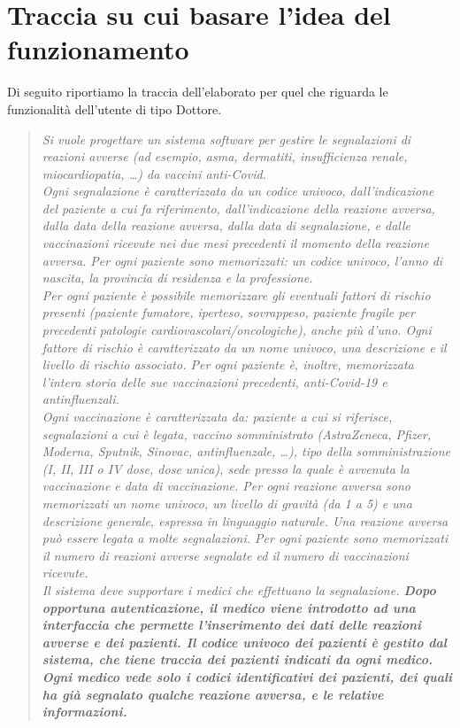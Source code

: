 \documentclass{article}
\begin{document}
\section{Traccia su cui basare l'idea del funzionamento}
    Di seguito riportiamo la traccia dell'elaborato per quel che riguarda le funzionalità dell'utente di tipo Dottore.
    \begin{quotation}
       \textit{Si vuole progettare un sistema software per gestire le segnalazioni di reazioni avverse (ad esempio, asma, dermatiti, insufficienza renale, miocardiopatia, \dots) da vaccini anti-Covid.\\
        Ogni segnalazione è caratterizzata da un codice univoco, dall'indicazione del paziente a cui fa riferimento, dall'indicazione della reazione avversa, dalla data della reazione avversa, dalla data di segnalazione, e dalle vaccinazioni ricevute nei due mesi precedenti il momento della reazione avversa.
        Per ogni paziente sono memorizzati: un codice univoco, l'anno di nascita, la provincia di residenza e la professione.\\
        Per ogni paziente è possibile memorizzare gli eventuali fattori di rischio presenti (paziente fumatore, iperteso, sovrappeso, paziente fragile per precedenti patologie cardiovascolari/oncologiche), anche più d'uno. Ogni fattore di rischio è caratterizzato da un nome univoco, una descrizione e il livello di rischio associato. Per ogni paziente è, inoltre, memorizzata l'intera storia delle sue vaccinazioni precedenti, anti-Covid-19 e antinfluenzali.\\
        Ogni vaccinazione è caratterizzata da: paziente a cui si riferisce, segnalazioni a cui è legata, vaccino somministrato (AstraZeneca, Pfizer, Moderna, Sputnik, Sinovac, antinfluenzale, \dots), tipo della somministrazione (I, II, III o IV dose, dose unica), sede presso la quale è avvenuta la vaccinazione e data di vaccinazione. Per ogni reazione avversa sono memorizzati un nome univoco, un livello di gravità (da 1 a 5) e una descrizione generale, espressa in linguaggio naturale. Una reazione avversa può essere legata a molte segnalazioni. Per ogni paziente sono memorizzati il numero di reazioni avverse segnalate ed il numero di vaccinazioni ricevute.\\
        Il sistema deve supportare i medici che effettuano la segnalazione. \textbf{Dopo opportuna autenticazione, il medico viene introdotto ad una interfaccia che permette l'inserimento dei dati delle reazioni avverse e dei pazienti. Il codice univoco dei pazienti è gestito dal sistema, che tiene traccia dei pazienti indicati da ogni medico. Ogni medico vede solo i codici identificativi dei pazienti, dei quali ha già segnalato qualche reazione avversa, e le relative informazioni.}}
    \end{quotation}
\end{document}
